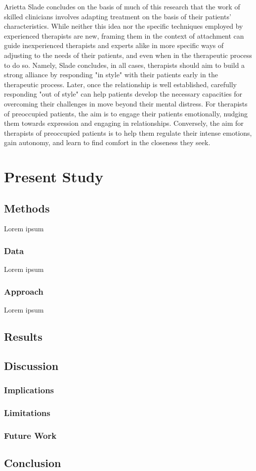 \documentclass[12pt]{report}
\begin{document}
Arietta Slade \cite{Slade2016} concludes on the basis of much of this research that the work of skilled clinicians involves adapting treatment on the basis of their patients' characteristics. While neither this idea nor the specific techniques employed by experienced therapists are new, framing them in the context of attachment can guide inexperienced therapists and experts alike in more specific ways of adjusting to the needs of their patients, and even when in the therapeutic process to do so.
Namely, Slade concludes, in all cases, therapists should aim to build a strong alliance by responding "in style" with their patients early in the therapeutic process. Later, once the relationship is well established, carefully responding "out of style" can help patients develop the necessary capacities for overcoming their challenges in move beyond their mental distress. For therapists of preoccupied patients, the aim is to engage their patients emotionally, nudging them towards expression and engaging in relationships.
Conversely, the aim for therapists of preoccupied patients is to help them regulate their intense emotions, gain autonomy, and learn to find comfort in the closeness they seek.

\chapter{Present Study}
\section{Methods}
Lorem ipsum

\subsection{Data}
Lorem ipsum

\subsection{Approach}
Lorem ipsum

\section{Results}

\section{Discussion}

\subsection{Implications}

\subsection{Limitations}

\subsection{Future Work}

\section{Conclusion}




\appendix
\end{document}
